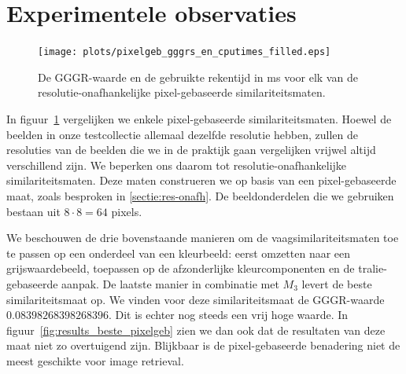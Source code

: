 \section{Experimentele observaties}

\begin{figure}[tbp]
\begin{center}
\texttt{[image: plots/pixelgeb\_gggrs\_en\_cputimes\_filled.eps]}
\caption{\label{fig:pixelgeb_gggrs_en_cputimes}De GGGR-waarde en de gebruikte rekentijd in ms voor elk van de resolutie-onafhankelijke pixel-gebaseerde similariteitsmaten.}
\end{center}
\end{figure}

In figuur~\ref{fig:pixelgeb_gggrs_en_cputimes} vergelijken we enkele pixel-gebaseerde similariteitsmaten.
Hoewel de beelden in onze testcollectie allemaal dezelfde resolutie hebben, zullen de
resoluties van de beelden die we in de praktijk gaan vergelijken vrijwel altijd verschillend zijn.
We beperken ons daarom tot resolutie-onafhankelijke similariteitsmaten. Deze maten construeren
we op basis van een pixel-gebaseerde maat, zoals besproken in \ref{sectie:res-onafh}. De 
beeldonderdelen die we gebruiken bestaan uit $8 \cdot 8 = 64$ pixels.

We beschouwen de drie bovenstaande manieren om de vaagsimilariteitsmaten toe te passen op een 
onderdeel van een kleurbeeld:
eerst omzetten naar een grijswaardebeeld, 
toepassen op de afzonderlijke kleurcomponenten en 
de tralie-gebaseerde aanpak.
De laatste manier in combinatie met $M_{3}$ levert de beste similariteitsmaat op. We vinden
voor deze similariteitsmaat de GGGR-waarde $0.08398268398268396$. Dit is echter nog steeds een
vrij hoge waarde. In figuur~\ref{fig:results_beste_pixelgeb}
zien we dan ook dat de resultaten van deze maat niet zo overtuigend zijn. Blijkbaar 
is de pixel-gebaseerde benadering niet de meest geschikte voor image retrieval. 


